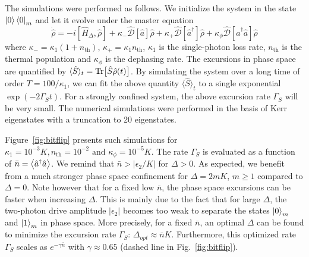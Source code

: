 \documentclass[%
 reprint,
 superscriptaddress,
 amsmath,
 amssymb,
 aps,
 pra,
 10pt
]{revtex4-2}
\newcommand{\nbar}{\bar{n}}
\newcommand{\adag}{\hat{a}^\dagger}
\newcommand{\hata}{\hat{a}}
\begin{document}
The simulations were performed as follows. We initialize the system in the state $\ket{0}{\bra{0}}_m$ and let it evolve under the master equation 
\begin{equation}
    \dot{\hat\rho} = -i [\hat H_\Delta,\hat \rho] + \kappa_- \mathcal{\hat D}[\hata]\hat \rho + \kappa_+ \mathcal{\hat D}[\adag]\hat \rho + \kappa_\phi \mathcal{\hat D}[\adag \hata]\hat \rho
\end{equation}
where $\kappa_- = \kappa_1 (1 + n_{\text{th}})$, $\kappa_+ = \kappa_1 n_{\text{th}}$, $\kappa_1$ is the single-photon loss rate, $n_{\text{th}}$ is the thermal population and $\kappa_\phi$ is the dephasing rate. The excursions in phase space are quantified by $\langle \hat S \rangle_t = \Tr\bigl[\hat S\hat\rho(t)\bigr]$. By simulating the system over a long time of order $T=100/\kappa_1$, we can fit the above quantity $\langle \hat S\rangle_t$ to a single exponential $\exp(-2\Gamma_S t)$. For a strongly confined system, the above excursion rate $\Gamma_S$ will be very small.  The numerical simulations were performed in the basis of Kerr eigenstates with a truncation to 20 eigenstates.

Figure~\ref{fig:bitflip} presents such simulations for $\kappa_1 = 10^{-3}K,n_{\text{th}} = 10^{-2} \text{ and } \kappa_\phi = 10^{-5}K$. The rate $\Gamma_S$ is evaluated as a function of $\bar{n} = \expval{\adag \hata}$. We remind that $\bar{n} > |\epsilon_2/K|$ for $\Delta>0$. As expected, we benefit from a much stronger phase space confinement for $\Delta = 2mK$, $m \ge 1$ compared to $\Delta = 0$. Note however that for a fixed low $\bar{n}$, the phase space excursions can be faster when increasing $\Delta$. This is mainly due to the fact that for large $\Delta$, the two-photon drive amplitude $|\epsilon_2|$ becomes too weak to separate the states $\ket{0}_m$ and $\ket{1}_m$ in phase space.  More precisely, for a fixed $\bar{n}$, an optimal $\Delta$ can be found to minimize the excursion rate $\Gamma_S$: $\Delta_{opt} \approx \nbar K$. Furthermore, this optimized rate $\Gamma_S$ scales as $e^{-\gamma\bar{n}}$ with $\gamma \approx 0.65$ (dashed line in Fig.~\ref{fig:bitflip}).
\end{document}
